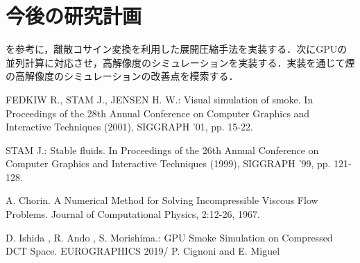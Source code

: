 \documentclass[10pt,a4paper,notitlepage,oneside,twocolumn]{abst_jsarticle}
\begin{document}
\section{今後の研究計画}
\cite{GPU}を参考に，離散コサイン変換を利用した展開圧縮手法を実装する．次にGPUの並列計算に対応させ，高解像度のシミュレーションを実装する．実装を通じて煙の高解像度のシミュレーションの改善点を模索する．
\begin{thebibliography}{99}

FEDKIW R., STAM J., JENSEN H. W.: Visual simulation of smoke. In Proceedings of the 28th Annual Conference on Computer Graphics and Interactive Techniques (2001), SIGGRAPH ’01, pp. 15-22. 

STAM J.: Stable fluids. In Proceedings of the 26th Annual Conference on Computer Graphics and Interactive Techniques (1999), SIGGRAPH ’99, pp. 121-128. 

A. Chorin. A Numerical Method for Solving Incompressible Viscous Flow Problems. Journal of Computational Physics, 2:12-26, 1967.

D. Ishida , R. Ando , S. Morishima.: GPU Smoke Simulation on Compressed DCT Space. EUROGRAPHICS 2019/ P. Cignoni and E. Miguel

\end{thebibliography}
\end{document}

